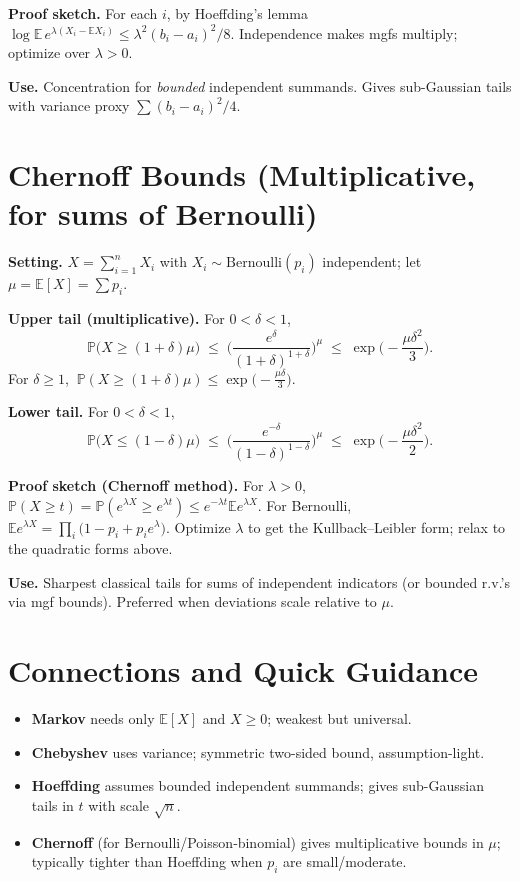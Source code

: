 \documentclass[11pt]{article}
\begin{document}
\textbf{Proof sketch.} For each $i$, by Hoeffding’s lemma
$\log \mathbb{E}\,e^{\lambda(X_i-\mathbb{E}X_i)} \le \lambda^2(b_i-a_i)^2/8$.
Independence makes mgfs multiply; optimize over $\lambda>0$.

\textbf{Use.} Concentration for \emph{bounded} independent summands. Gives sub-Gaussian
tails with variance proxy $\sum (b_i-a_i)^2/4$.

\section{Chernoff Bounds (Multiplicative, for sums of Bernoulli)}
\textbf{Setting.} $X=\sum_{i=1}^n X_i$ with $X_i\sim\mathrm{Bernoulli}(p_i)$ independent;
let $\mu=\mathbb{E}[X]=\sum p_i$.

\textbf{Upper tail (multiplicative).} For $0<\delta<1$,
\[
		\mathbb{P}\big(X \ge (1+\delta)\mu\big)
		\;\le\;
		\Big(\frac{e^\delta}{(1+\delta)^{1+\delta}}\Big)^{\mu}
		\;\le\;
		\exp\!\Big(-\frac{\mu\delta^2}{3}\Big).
\]
For $\delta\ge 1$,
$\ \mathbb{P}(X \ge (1+\delta)\mu) \le \exp\!\big(-\frac{\mu\delta}{3}\big)$.

\textbf{Lower tail.} For $0<\delta<1$,
\[
		\mathbb{P}\big(X \le (1-\delta)\mu\big)
		\;\le\;
		\Big(\frac{e^{-\delta}}{(1-\delta)^{1-\delta}}\Big)^{\mu}
		\;\le\;
		\exp\!\Big(-\frac{\mu\delta^2}{2}\Big).
\]

\textbf{Proof sketch (Chernoff method).} For $\lambda>0$,
$\mathbb{P}(X\ge t)=\mathbb{P}(e^{\lambda X}\ge e^{\lambda t})\le e^{-\lambda
t}\mathbb{E}e^{\lambda X}$.
For Bernoulli, $\mathbb{E}e^{\lambda X}=\prod_i\big(1-p_i+p_i e^{\lambda}\big)$.
Optimize $\lambda$ to get the Kullback–Leibler form; relax to the quadratic forms above.

\textbf{Use.} Sharpest classical tails for sums of independent indicators (or bounded
r.v.'s via mgf bounds). Preferred when deviations scale relative to $\mu$.

\section{Connections and Quick Guidance}
\begin{itemize}
  \item \textbf{Markov} needs only $\mathbb{E}[X]$ and $X\ge0$; weakest but universal.
  \item \textbf{Chebyshev} uses variance; symmetric two-sided bound, assumption-light.
		\item \textbf{Hoeffding} assumes bounded independent summands; gives sub-Gaussian tails
				in $t$ with scale $\sqrt{n}$.
		\item \textbf{Chernoff} (for Bernoulli/Poisson‐binomial) gives multiplicative bounds in
				$\mu$; typically tighter than Hoeffding when $p_i$ are small/moderate.
\end{itemize}
\end{document}
